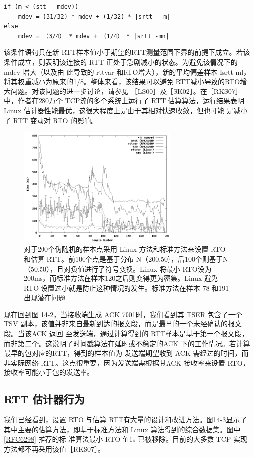 \begin{lstlisting}[]
if (m < (stt - mdev))
    mdev = (31/32) * mdev + (1/32) * |srtt - m|
else
    mdev = （3/4） * mdev + （1/4） * |srtt -mn|
\end{lstlisting}

该条件语句只在新 RTT样本值小于期望的RTT测量范围下界的前提下成立。若该条件成立，则表明该连接的 RTT 正处于急剧减小的状态。为避免该情况下的 mdev 增大（以及由
此导致的 rttvar 和RTO增大），新的平均偏差样本 Isrtt-ml，将其权重减小为原来的1/8。整体来看，该结果可以避免 RTT减小导致的RTO增大问题。对该问题的进一步讨论，请参见
［LS00］及［SK02］。在［RKS07］中，作者在280万个 TCP流的多个系统上运行了 RTT 估算算法，运行结果表明 Linux 估计器性能最优，这很大程度上是由于其相对快速收敛，但也可能
是减小了 RTT 变动对 RTO 的影响。

\begin{figure}[!htb]
    \centering
	\includegraphics[width=0.7\textwidth]{imgs/14/14-3.png}
	\caption{对于200个伪随机的样本点采用 Linux 方法和标准方法来设置 RTO 和估算 RTT。前100个点是基于分布 N（200,50），后100个则基于N（50,50），且对负值进行了符号变换。Linux 将最小
    RTO设为200ms，而标准方法在样本120之后则变得更为密集。Linux 避免 RTO 设置过小就是防止这种情况的发生。标准方法在样本 78 和191 出现潜在问题}
\end{figure}

现在回到图 14-2，当接收端生成 ACK 7001时，我们看到其 TSER 包含了一个 TSV 副本，该值并非来自最新到达的报文段，而是最早的一个未经确认的报文段。当该ACK 返回
至发送端，通过计算得到的 RTT样本是基于第一个报文段，而非第二个。这说明了时间戳算法在延时或不稳定的ACK 下的工作情况。若计算最早的包对应的RTT，得到的样本值为
发送端期望收到 ACK 需经过的时间，而非实际网络 RTT。这点很重要，因为发送端需根据其ACK 接收率来设置 RTO，接收率可能小于包的发送率。

\subsection{RTT 估计器行为}
我们已经看到，设置 RTO 与估算 RTT有大量的设计和改进方法。图14-3显示了其中主要的估算方法，即基于标准方法和 Linux 算法得到的综合数据集。图中\href{https://www.rfc-editor.org/rfc/rfc6298}{[RFC6298]} 推荐的标
准算法最小 RTO 值1s 已被移除。目前的大多数 TCP 实现方法都不再采用该值［RKS07］。

